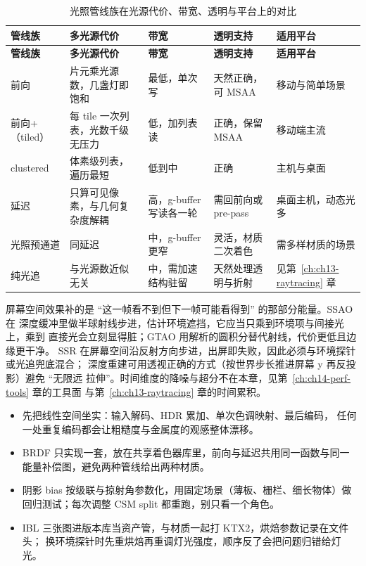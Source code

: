\documentclass[12pt,a4paper,fontset=fandol]{ctexbook}
\begin{document}
\begin{longtable}{>{\raggedright\arraybackslash}p{}
                  >{\raggedright\arraybackslash}p{}
                  >{\raggedright\arraybackslash}p{}
                  >{\raggedright\arraybackslash}p{}
                  >{\raggedright\arraybackslash}p{}}
\caption{光照管线族在光源代价、带宽、透明与平台上的对比}\label{tab:ch12-pipelines} \\
\toprule
\textbf{管线族} & \textbf{多光源代价} & \textbf{带宽} & \textbf{透明支持} & \textbf{适用平台} \\
\midrule
\endfirsthead
\toprule
\textbf{管线族} & \textbf{多光源代价} & \textbf{带宽} & \textbf{透明支持} & \textbf{适用平台} \\
\midrule
\endhead
\midrule
\endfoot
\bottomrule
\endlastfoot
前向 & 片元乘光源数，几盏灯即饱和 & 最低，单次写 & 天然正确，可 MSAA & 移动与简单场景 \\
前向+（tiled） & 每 tile 一次列表，光数千级无压力 & 低，加列表读 & 正确，保留 MSAA & 移动端主流 \\
clustered & 体素级列表，遍历最短 & 低到中 & 正确 & 主机与桌面 \\
延迟 & 只算可见像素，与几何复杂度解耦 & 高，g-buffer 写读各一轮 & 需回前向或 pre-pass & 桌面主机，动态光多 \\
光照预通道 & 同延迟 & 中，g-buffer 更窄 & 灵活，材质二次着色 & 需多样材质的场景 \\
纯光追 & 与光源数近似无关 & 中，需加速结构驻留 & 天然处理透明与折射 & 见第~\ref{ch:ch13-raytracing} 章 \\
\end{longtable}

屏幕空间效果补的是 ``这一帧看不到但下一帧可能看得到'' 的那部分能量。SSAO 在
深度缓冲里做半球射线步进，估计环境遮挡，它应当只乘到环境项与间接光上，乘到
直接光会立刻显得脏；GTAO 用解析的圆积分替代射线，代价更低且边缘更干净。
SSR 在屏幕空间沿反射方向步进，出屏即失败，因此必须与环境探针或光追兜底混合；
深度重建可用透视正确的方式（按世界步长推进屏幕 y 再反投影）避免 ``无限远
拉伸''。时间维度的降噪与超分不在本章，见第~\ref{ch:ch14-perf-tools} 章的工具面
与第~\ref{ch:ch13-raytracing} 章的时间累积。

\begin{bestpractice}[title={把 PBR 链跑稳的顺序}]
\begin{itemize}
\item 先把线性空间坐实：输入解码、HDR 累加、单次色调映射、最后编码，
任何一处重复编码都会让粗糙度与金属度的观感整体漂移。
\item BRDF 只实现一套，放在共享着色器库里，前向与延迟共用同一函数与同一
能量补偿图，避免两种管线给出两种材质。
\item 阴影 bias 按级联与掠射角参数化，用固定场景（薄板、栅栏、细长物体）做
回归测试；每次调整 CSM split 都重跑，别只看一个角色。
\item IBL 三张图进版本库当资产管，与材质一起打 KTX2，烘焙参数记录在文件头；
换环境探针时先重烘焙再重调灯光强度，顺序反了会把问题归错给灯光。
\end{itemize}
\end{bestpractice}
\end{document}
